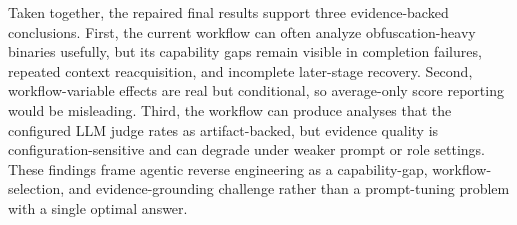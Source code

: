 Taken together, the repaired final results support three evidence-backed conclusions. First, the current workflow can often analyze obfuscation-heavy binaries usefully, but its capability gaps remain visible in completion failures, repeated context reacquisition, and incomplete later-stage recovery. Second, workflow-variable effects are real but conditional, so average-only score reporting would be misleading. Third, the workflow can produce analyses that the configured LLM judge rates as artifact-backed, but evidence quality is configuration-sensitive and can degrade under weaker prompt or role settings. These findings frame agentic reverse engineering as a capability-gap, workflow-selection, and evidence-grounding challenge rather than a prompt-tuning problem with a single optimal answer.
